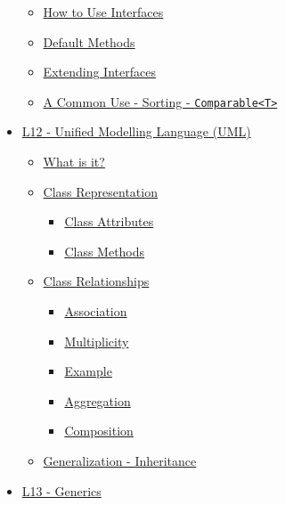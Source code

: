 \documentclass[]{article}
\providecommand{\tightlist}{%
  \setlength{\itemsep}{0pt}\setlength{\parskip}{0pt}}
\begin{document}
\begin{itemize}
  \begin{itemize}
  \tightlist
  \item
    \protect\hyperlink{how-to-use-interfaces}{How to Use Interfaces}
  \item
    \protect\hyperlink{default-methods}{Default Methods}
  \item
    \protect\hyperlink{extending-interfaces}{Extending Interfaces}
  \item
    \protect\hyperlink{a-common-use---sorting---ux5cux2560comparableux5cux253Ctux5cux253Eux5cux2560}{A
    Common Use - Sorting -
    \texttt{Comparable\textless{}T\textgreater{}}}
  \end{itemize}
\item
  \protect\hyperlink{l12---unified-modelling-language-uml}{L12 - Unified
  Modelling Language (UML)}

  \begin{itemize}
  \tightlist
  \item
    \protect\hyperlink{what-is-itux3f}{What is it?}
  \item
    \protect\hyperlink{class-representation}{Class Representation}

    \begin{itemize}
    \tightlist
    \item
      \protect\hyperlink{class-attributes}{Class Attributes}
    \item
      \protect\hyperlink{class-methods}{Class Methods}
    \end{itemize}
  \item
    \protect\hyperlink{class-relationships}{Class Relationships}

    \begin{itemize}
    \tightlist
    \item
      \protect\hyperlink{association}{Association}
    \item
      \protect\hyperlink{multiplicity}{Multiplicity}
    \item
      \protect\hyperlink{example}{Example}
    \item
      \protect\hyperlink{aggregation}{Aggregation}
    \item
      \protect\hyperlink{composition}{Composition}
    \end{itemize}
  \item
    \protect\hyperlink{generalization---inheritance}{Generalization -
    Inheritance}
  \end{itemize}
\item
  \protect\hyperlink{l13---generics}{L13 - Generics}


\end{itemize}
\end{document}
